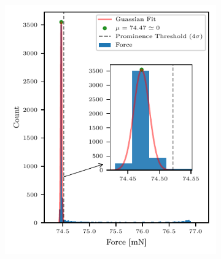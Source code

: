 \documentclass{report}
\begin{document}
     \begin{figure}[H]
                \centering

                 \begin{subfigure}[b]{0.45\textwidth}
                    \includegraphics[width=\textwidth, height=0.49\textheight]{plots/chapter_3/force_histogram_inset.pdf}
                    \caption[Force Histogram]{}
                    \label{fig:force-histogram}
                \end{subfigure}
                ~
                \begin{subfigure}[b]{0.45\textwidth}

\end{subfigure}
\end{figure}
\end{document}
